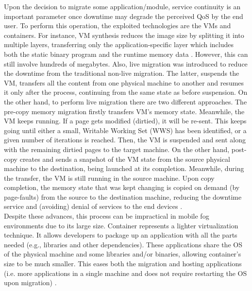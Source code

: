 \noindent\tab Upon the decision to migrate some application/module, service continuity is an important parameter once downtime may degrade the perceived QoS by the end user. To perform this operation, the exploited technologies are the VMs and containers. For instance, VM synthesis reduces the image size by splitting it into multiple layers, transferring only the application-specific layer which includes both the static binary program and the runtime memory data \cite{ma2017efficient}. However, this can still involve hundreds of megabytes. Also, live migration was introduced to reduce the downtime from the traditional non-live migration. The latter, suspends the VM, transfers all the content from one physical machine to another and resumes it only after the process, continuing from the same state as before suspension. On the other hand, to perform live migration there are two different approaches. The pre-copy memory migration firstly transfers VM’s memory state. Meanwhile, the VM keeps running. If a page gets modified (dirtied), it will be re-sent. This keeps going until either a small, Writable Working Set (WWS) has been identified, or a given number of iterations is reached. Then, the VM is suspended and sent along with the remaining dirtied pages to the target machine. On the other hand, post-copy creates and sends a snapshot of the VM state from the source physical machine to the destination, being launched at its completion. Meanwhile, during the transfer, the VM is still running in the source machine. Upon copy completion, the memory state that was kept changing is copied on demand (by page-faults) from the source to the destination machine, reducing the downtime service and (avoiding) denial of services to the end devices \cite{hines2009post}.\\
\noindent\tab Despite these advances, this process can be impractical in mobile fog environments due to its large size. Container represents a lighter virtualization technique. It allows developers to package up an application with all the parts needed (e.g., libraries and other dependencies). These applications share the OS of the physical machine and some libraries and/or binaries, allowing container's size to be much smaller. This eases both the migration and hosting applications (i.e. more applications in a single machine and does not require restarting the OS upon migration) \cite{saurez2016incremental}.\\
